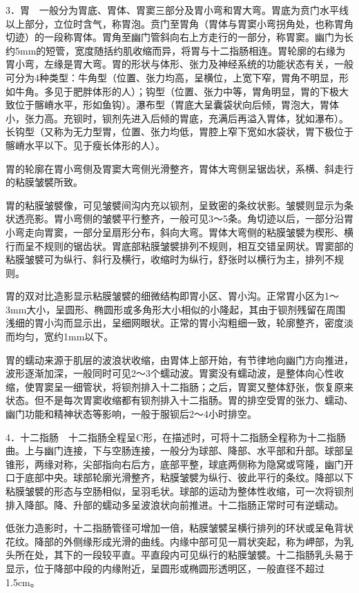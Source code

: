 3．胃　一般分为胃底、胃体、胃窦三部分及胃小弯和胃大弯。胃底为贲门水平线以上部分，立位时含气，称胃泡。贲门至胃角（胃体与胃窦小弯拐角处，也称胃角切迹）的一段称胃体。胃角至幽门管斜向右上方走行的一部分，称胃窦。幽门为长约5mm的短管，宽度随括约肌收缩而异，将胃与十二指肠相连。胃轮廓的右缘为胃小弯，左缘是胃大弯。胃的形状与体形、张力及神经系统的功能状态有关，一般可分为4种类型：牛角型（位置、张力均高，呈横位，上宽下窄，胃角不明显，形如牛角。多见于肥胖体形的人）；钩型（位置、张力中等，胃角明显，胃的下极大致位于髂嵴水平，形如鱼钩）。瀑布型（胃底大呈囊袋状向后倾，胃泡大，胃体小，张力高。充钡时，钡剂先进入后倾的胃底，充满后再溢入胃体，犹如瀑布）。长钩型（又称为无力型胃，位置、张力均低，胃腔上窄下宽如水袋状，胃下极位于髂嵴水平以下。见于瘦长体形的人）。

胃的轮廓在胃小弯侧及胃窦大弯侧光滑整齐，胃体大弯侧呈锯齿状，系横、斜走行的粘膜皱襞所致。

胃的粘膜皱襞像，可见皱襞间沟内充以钡剂，呈致密的条纹状影。皱襞则显示为条状透亮影。胃小弯侧的皱襞平行整齐，一般可见3～5条。角切迹以后，一部分沿胃小弯走向胃窦，一部分呈扇形分布，斜向大弯。胃体大弯侧的粘膜皱襞为楔形、横行而呈不规则的锯齿状。胃底部粘膜皱襞排列不规则，相互交错呈网状。胃窦部的粘膜皱襞可为纵行、斜行及横行，收缩时为纵行，舒张时以横行为主，排列不规则。

胃的双对比造影显示粘膜皱襞的细微结构即胃小区、胃小沟。正常胃小区为1～3mm大小，呈圆形、椭圆形或多角形大小相似的小隆起，其由于钡剂残留在周围浅细的胃小沟而显示出，呈细网眼状。正常的胃小沟粗细一致，轮廓整齐，密度淡而均匀，宽约1mm以下。

胃的蠕动来源于肌层的波浪状收缩，由胃体上部开始，有节律地向幽门方向推进，波形逐渐加深，一般同时可见2～3个蠕动波。胃窦没有蠕动波，是整体向心性收缩，使胃窦呈一细管状，将钡剂排入十二指肠；之后，胃窦又整体舒张，恢复原来状态。但不是每次胃窦收缩都有钡剂排入十二指肠。胃的排空受胃的张力、蠕动、幽门功能和精神状态等影响，一般于服钡后2～4小时排空。

4．十二指肠　十二指肠全程呈C形，在描述时，可将十二指肠全程称为十二指肠曲。上与幽门连接，下与空肠连接，一般分为球部、降部、水平部和升部。球部呈锥形，两缘对称，尖部指向右后方，底部平整，球底两侧称为隐窝或穹隆，幽门开口于底部中央。球部轮廓光滑整齐，粘膜皱襞为纵行、彼此平行的条纹。降部以下粘膜皱襞的形态与空肠相似，呈羽毛状。球部的运动为整体性收缩，可一次将钡剂排入降部。降、升部的蠕动多呈波浪状向前推进。十二指肠正常时可有逆蠕动。

低张力造影时，十二指肠管径可增加一倍，粘膜皱襞呈横行排列的环状或呈龟背状花纹。降部的外侧缘形成光滑的曲线。内缘中部可见一肩状突起，称为岬部，为乳头所在处，其下的一段较平直。平直段内可见纵行的粘膜皱襞。十二指肠乳头易于显示，位于降部中段的内缘附近，呈圆形或椭圆形透明区，一般直径不超过1.5cm。

